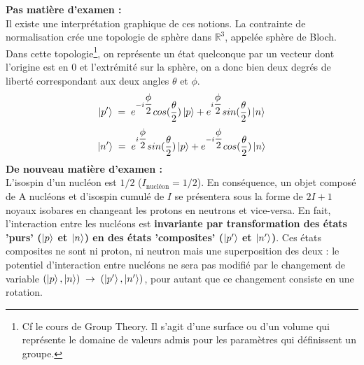 \textbf{Pas matière d'examen :}\\
Il existe une interprétation graphique de ces notions. La contrainte de normalisation crée une topologie de sphère dans $\mathbb{R}^3$, appelée sphère de Bloch. Dans cette topologie\footnote{Cf le cours de Group Theory. Il s'agit d'une surface ou d'un volume qui représente le domaine de valeurs admis pour les paramètres qui définissent un groupe.}, on représente un état quelconque par un vecteur dont l'origine est en 0 et l'extrémité sur la sphère, on a donc bien deux degrés de liberté correspondant aux deux angles $\theta$ et $\phi$.\\
\begin{equation*}
    \ket{p'} \; = \; e^{-i\dfrac{\phi}{2}}cos(\dfrac{\theta}{2})\ket{p} + e^{i\dfrac{\phi}{2}}sin(\dfrac{\theta}{2})\ket{n}
\end{equation*}
\begin{equation*}
    \ket{n'} \; = \; e^{i\dfrac{\phi}{2}}sin(\dfrac{\theta}{2})\ket{p} + e^{-i\dfrac{\phi}{2}}cos(\dfrac{\theta}{2})\ket{n}
\end{equation*}
\textbf{De nouveau matière d'examen :}\\
L'isospin d'un nucléon est $1/2$ ($I_{\text{nucléon}} =1/2$). En conséquence, un objet composé de A nucléons et d'isospin cumulé de $I$ se présentera sous la forme de $2I+1$ noyaux isobares en changeant les protons en neutrons et vice-versa. En fait, l'interaction entre les nucléons est \textbf{invariante par transformation des états 'purs' ($\ket{p}$ et $\ket{n}$) en des états 'composites' ($\ket{p'}$ et $\ket{n'}$)}. Ces états composites ne sont ni proton, ni neutron mais une superposition des deux : le potentiel d'interaction entre nucléons ne sera pas modifié par le changement de variable $(\ket{p},\ket{n}) \;\rightarrow\; (\ket{p'},\ket{n'})$, pour autant que ce changement consiste en une rotation.\\

